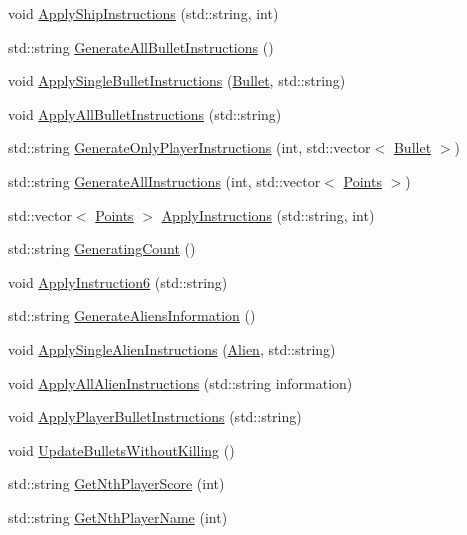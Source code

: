 \begin{DoxyCompactItemize}
\item 
void \hyperlink{classBoard_a3f6988dceae7aaffc1b81a019b98e6fd}{Apply\-Ship\-Instructions} (std\-::string, int)
\item 
std\-::string \hyperlink{classBoard_a3af7dcf1ed2916ee831b06342ee17ab4}{Generate\-All\-Bullet\-Instructions} ()
\item 
void \hyperlink{classBoard_ae3a6257c9312f10907e4df3e08a75073}{Apply\-Single\-Bullet\-Instructions} (\hyperlink{classBullet}{Bullet}, std\-::string)
\item 
void \hyperlink{classBoard_aa60144e2c1af9154229961198917ce56}{Apply\-All\-Bullet\-Instructions} (std\-::string)
\item 
std\-::string \hyperlink{classBoard_a04b03e340f5b074f9129173575ba46b9}{Generate\-Only\-Player\-Instructions} (int, std\-::vector$<$ \hyperlink{classBullet}{Bullet} $>$)
\item 
std\-::string \hyperlink{classBoard_a210c0bcf1937c0ba0d8198cff40c232d}{Generate\-All\-Instructions} (int, std\-::vector$<$ \hyperlink{structPoints}{Points} $>$)
\item 
std\-::vector$<$ \hyperlink{structPoints}{Points} $>$ \hyperlink{classBoard_a1cbbfbb26c49b32017d13ec332530247}{Apply\-Instructions} (std\-::string, int)
\item 
std\-::string \hyperlink{classBoard_abe8f70187c975e5e68b92bc5f5446e70}{Generating\-Count} ()
\item 
void \hyperlink{classBoard_aea97ca6513d5759d9eb37c9483e45367}{Apply\-Instruction6} (std\-::string)
\item 
std\-::string \hyperlink{classBoard_a7a4906d19da2e17681df238496d9a310}{Generate\-Aliens\-Information} ()
\item 
void \hyperlink{classBoard_a0f7f494542205d13cc2db1001ca5ca26}{Apply\-Single\-Alien\-Instructions} (\hyperlink{classAlien}{Alien}, std\-::string)
\item 
void \hyperlink{classBoard_a489defda1d454e9966523c307ff0d782}{Apply\-All\-Alien\-Instructions} (std\-::string information)
\item 
void \hyperlink{classBoard_a2312c88b4aa6d2d7a8bcab885fc19616}{Apply\-Player\-Bullet\-Instructions} (std\-::string)
\item 
void \hyperlink{classBoard_a24528a3e4b4ec51af758b5852508b491}{Update\-Bullets\-Without\-Killing} ()
\item 
std\-::string \hyperlink{classBoard_ac23c3d4b4895b5de1c255e5126cc1005}{Get\-Nth\-Player\-Score} (int)
\item 
std\-::string \hyperlink{classBoard_ab5015e28895749c3adc711fa443e298d}{Get\-Nth\-Player\-Name} (int)

\end{DoxyCompactItemize}
